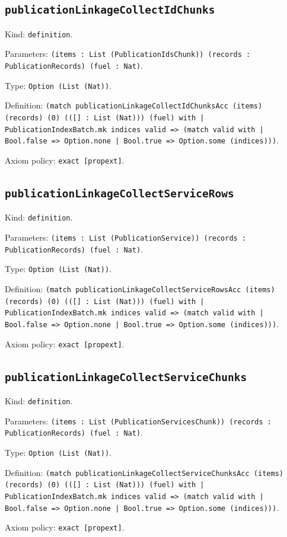 \documentclass[11pt]{article}
\begin{document}
\subsection*{\texttt{publicationLinkageCollectIdChunks}}
\noindent Kind: \texttt{definition}.\par
\noindent Parameters: \texttt{(items : List (PublicationIdsChunk)) (records : PublicationRecords) (fuel : Nat)}.\par
\noindent Type: \texttt{Option (List (Nat))}.\par
\noindent Definition: \texttt{(match publicationLinkageCollectIdChunksAcc (items) (records) (0) (([] : List (Nat))) (fuel) with | PublicationIndexBatch.mk indices valid => (match valid with | Bool.false => Option.none | Bool.true => Option.some (indices)))}.\par
\noindent Axiom policy: \texttt{exact [propext]}.\par
\subsection*{\texttt{publicationLinkageCollectServiceRows}}
\noindent Kind: \texttt{definition}.\par
\noindent Parameters: \texttt{(items : List (PublicationService)) (records : PublicationRecords) (fuel : Nat)}.\par
\noindent Type: \texttt{Option (List (Nat))}.\par
\noindent Definition: \texttt{(match publicationLinkageCollectServiceRowsAcc (items) (records) (0) (([] : List (Nat))) (fuel) with | PublicationIndexBatch.mk indices valid => (match valid with | Bool.false => Option.none | Bool.true => Option.some (indices)))}.\par
\noindent Axiom policy: \texttt{exact [propext]}.\par
\subsection*{\texttt{publicationLinkageCollectServiceChunks}}
\noindent Kind: \texttt{definition}.\par
\noindent Parameters: \texttt{(items : List (PublicationServicesChunk)) (records : PublicationRecords) (fuel : Nat)}.\par
\noindent Type: \texttt{Option (List (Nat))}.\par
\noindent Definition: \texttt{(match publicationLinkageCollectServiceChunksAcc (items) (records) (0) (([] : List (Nat))) (fuel) with | PublicationIndexBatch.mk indices valid => (match valid with | Bool.false => Option.none | Bool.true => Option.some (indices)))}.\par
\noindent Axiom policy: \texttt{exact [propext]}.\par
\end{document}
